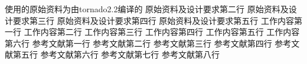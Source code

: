 \assignReq
{使用的原始资料为由tornado2.2编译的}
{原始资料及设计要求第二行}
{原始资料及设计要求第三行}
{原始资料及设计要求第四行}
{原始资料及设计要求第五行}
\assignWork
{工作内容第一行}
{工作内容第二行}
{工作内容第三行}
{工作内容第四行}
{工作内容第五行}
{工作内容第六行}
\assignRef
{参考文献第一行}
{参考文献第二行}
{参考文献第三行}
{参考文献第四行}
{参考文献第五行}
{参考文献第六行}
{参考文献第七行}
{参考文献第八行}
